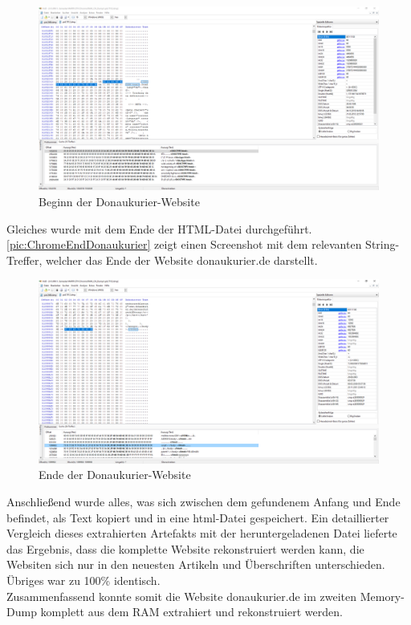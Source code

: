 \begin{figure}[h!]
	\centering
	\includegraphics[width=\textwidth]{bilder/HxDChrome1.png}
	\caption{Beginn der Donaukurier-Website}
	\label{pic:ChromeBeginDonaukurier}
\end{figure} 

Gleiches wurde mit dem Ende der HTML-Datei durchgeführt. \autoref{pic:ChromeEndDonaukurier} zeigt einen Screenshot mit dem relevanten String-Treffer, welcher das Ende der Website donaukurier.de darstellt.

\begin{figure}[h!]
	\centering
	\includegraphics[width=\textwidth]{bilder/HxDChrome3.png}
	\caption{Ende der Donaukurier-Website}
	\label{pic:ChromeEndDonaukurier}
\end{figure} 

Anschließend wurde alles, was sich zwischen dem gefundenem Anfang und Ende befindet, als Text kopiert und in eine html-Datei gespeichert. Ein detaillierter Vergleich dieses extrahierten Artefakts mit der heruntergeladenen Datei lieferte das Ergebnis, dass die komplette Website rekonstruiert werden kann, die Websiten sich nur in den neuesten Artikeln und Überschriften unterschieden. Übriges war zu 100\% identisch. \\
Zusammenfassend konnte somit die Website \glqq{}donaukurier.de\grqq{} im zweiten Memory-Dump komplett aus dem RAM extrahiert und rekonstruiert werden.

